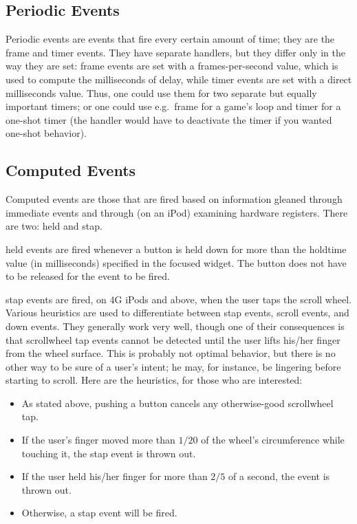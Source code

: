 \documentclass[12pt,letterpaper]{report}
\begin{document}
\subsection{Periodic Events}
Periodic events are events that fire every certain amount of time; they are the {\sf frame} and
{\sf timer} events. They have separate handlers, but they
differ only in the way they are set: {\sf frame} events are set with a frames-per-second value,
which is used to compute the milliseconds of delay, while {\sf timer} events are set with a direct
milliseconds value. Thus, one could use them for two separate but equally important timers; or one
could use e.g.~{\sf frame} for a game's loop and {\sf timer} for a one-shot timer (the handler
would have to deactivate the timer if you wanted one-shot behavior).

\subsection{Computed Events}
Computed events are those that are fired based on information gleaned through immediate events
and through (on an iPod) examining hardware registers. There are two: {\sf held} and {\sf stap}.

{\sf held} events are fired whenever a button is held down for more than the {\sf holdtime} value (in
milliseconds) specified in the focused widget. The button does not have to be released for the
event to be fired.

{\sf stap} events are fired, on 4G iPods and above, when the user taps the scroll wheel. Various heuristics
are used to differentiate between {\sf stap} events, {\sf scroll} events, and {\sf down} events.
They generally work very well, though one of their consequences is that scrollwheel tap events cannot
be detected until the user lifts his/her finger from the wheel surface. This is probably not optimal
behavior, but there is no other way to be sure of a user's intent; he may, for instance, be lingering
before starting to scroll. Here are the heuristics, for those who are interested:
\begin{itemize}
\item As stated above, pushing a button cancels any otherwise-good scrollwheel tap.
\item If the user's finger moved more than $1/20$ of the wheel's circumference while touching it,
      the {\sf stap} event is thrown out.
\item If the user held his/her finger for more than $2/5$ of a second, the event is thrown out.
\item Otherwise, a {\sf stap} event will be fired.
\end{itemize}
\end{document}
